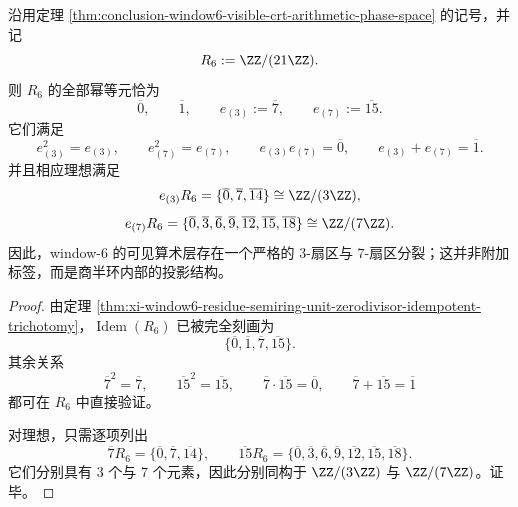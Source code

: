 \begin{proposition}\label{prop:conclusion-window6-crt-idempotent-sector-splitting}
沿用定理 \ref{thm:conclusion-window6-visible-crt-arithmetic-phase-space} 的记号，并记
\[
R_6:=\ZZ/(21\ZZ).
\]
则 \(R_6\) 的全部幂等元恰为
\[
\overline 0,\qquad \overline 1,\qquad e_{(3)}:=\overline 7,\qquad e_{(7)}:=\overline{15}.
\]
它们满足
\[
e_{(3)}^2=e_{(3)},
\qquad
e_{(7)}^2=e_{(7)},
\qquad
e_{(3)}e_{(7)}=\overline 0,
\qquad
e_{(3)}+e_{(7)}=\overline 1.
\]
并且相应理想满足
\[
e_{(3)}R_6=\{\overline 0,\overline 7,\overline{14}\}\cong \ZZ/(3\ZZ),
\]
\[
e_{(7)}R_6=\{\overline 0,\overline 3,\overline 6,\overline 9,\overline{12},\overline{15},\overline{18}\}\cong \ZZ/(7\ZZ).
\]
因此，window-\(6\) 的可见算术层存在一个严格的 \(3\)-扇区与 \(7\)-扇区分裂；这并非附加标签，而是商半环内部的投影结构。
\end{proposition}
\begin{proof}
由定理 \ref{thm:xi-window6-residue-semiring-unit-zerodivisor-idempotent-trichotomy}，\(\operatorname{Idem}(R_6)\) 已被完全刻画为
\[
\{\overline 0,\overline 1,\overline 7,\overline{15}\}.
\]
其余关系
\[
\overline 7^2=\overline 7,\qquad
\overline{15}^2=\overline{15},\qquad
\overline 7\cdot \overline{15}=\overline 0,\qquad
\overline 7+\overline{15}=\overline 1
\]
都可在 \(R_6\) 中直接验证。

对理想，只需逐项列出
\[
\overline 7R_6=\{\overline 0,\overline 7,\overline{14}\},
\qquad
\overline{15}R_6=\{\overline 0,\overline 3,\overline 6,\overline 9,\overline{12},\overline{15},\overline{18}\}.
\]
它们分别具有 \(3\) 个与 \(7\) 个元素，因此分别同构于 \(\ZZ/(3\ZZ)\) 与 \(\ZZ/(7\ZZ)\)。证毕。
\end{proof}

